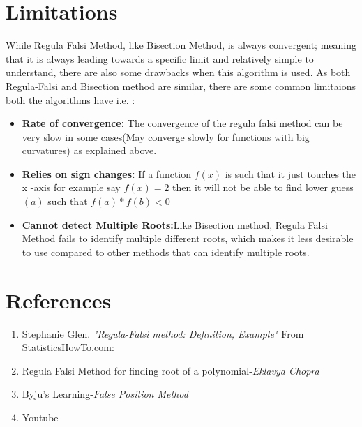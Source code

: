 \documentclass{article}
\begin{document}
\pagebreak
\section*{Limitations}
While Regula Falsi Method, like Bisection Method, is always convergent; meaning that it is always leading towards a specific limit and relatively simple to understand,  there are also some drawbacks when this algorithm is used. As both Regula-Falsi and Bisection method are similar, there are some common limitaions both the algorithms have i.e. :
\begin{itemize}
\item \textbf{Rate of convergence:} 
The convergence of the regula falsi method can be very slow in some cases(May converge slowly for functions with big curvatures) as explained above.
\item \textbf{Relies on sign changes:} If a function $f (x)$ is such that it just touches the x -axis for example say $f(x) = 2$ then it will not be able to find lower guess $(a)$ such that $f(a)*f(b) < 0$
\item \textbf{Cannot detect Multiple Roots:}Like Bisection method, Regula Falsi Method fails to identify multiple different roots, which makes it less desirable to use compared to other methods that can identify multiple roots.
\end{itemize}





\section*{References}
\begin{enumerate}
\item Stephanie Glen. \emph{"Regula-Falsi method: Definition, Example"} From StatisticsHowTo.com:
\item  Regula Falsi Method for finding root of a polynomial-\emph{Eklavya Chopra}
\item Byju's Learning-\emph{False Position Method}
\item Youtube
\end{enumerate}
\end{document}
